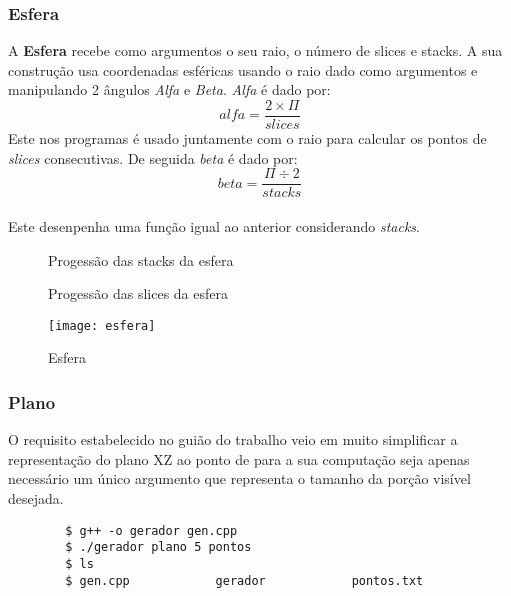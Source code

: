 \documentclass{article}
\begin{document}
\subsubsection{Esfera}
A \textbf{Esfera} recebe como argumentos o seu raio, o número de slices e stacks.
A sua construção usa coordenadas esféricas usando o raio dado como argumentos e manipulando 2 ângulos \textit{Alfa} e \textit{Beta}. \textit{Alfa} é dado por: \\
\[ alfa = \frac{2\times \Pi}{slices} \]
Este nos programas é usado juntamente com o raio para calcular os pontos de \textit{slices} consecutivas. De seguida \textit{beta} é dado por:\\
\[ beta = \frac{\Pi \div 2}{stacks}\] \\
Este desenpenha uma função igual ao anterior considerando \textit{stacks}.\\


\begin{figure}[H]
	\centering
	\hspace{2cm}
	\caption{Progessão das stacks da esfera}
\end{figure}

\begin{figure}[H]
	\centering
	\hspace{2cm}
	\caption{Progessão das slices da esfera}
\end{figure}

\begin{figure}[H]
	\centering
	\texttt{[image: esfera]}
	\caption{Esfera}
\end{figure}

\subsubsection{Plano}
O requisito estabelecido no guião do trabalho veio em muito simplificar a representação do plano XZ ao ponto de para a sua computação seja apenas necessário um único argumento que representa o tamanho da porção visível desejada.  

\begin{commandline}
    \begin{verbatim}
        $ g++ -o gerador gen.cpp
        $ ./gerador plano 5 pontos
        $ ls
        $ gen.cpp            gerador            pontos.txt
    \end{verbatim}
\end{commandline}
\end{document}
